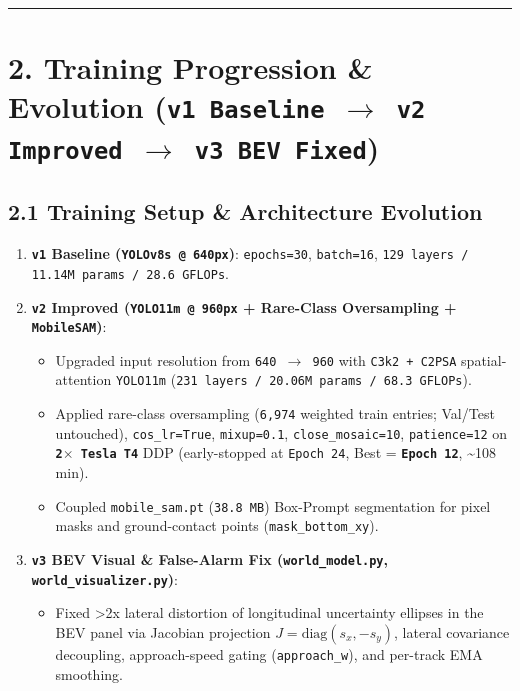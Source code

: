\documentclass[10.5pt,a4paper]{article}
\begin{document}
\par\noindent\rule{\textwidth}{0.4pt}\par\medskip

\section{2. Training Progression \& Evolution (\texttt{v1 Baseline $\rightarrow$ v2 Improved $\rightarrow$ v3 BEV Fixed})}

\subsection{2.1 Training Setup \& Architecture Evolution}
\begin{enumerate}[leftmargin=1.8em,itemsep=2pt]
\item \textbf{\texttt{v1} Baseline (\texttt{YOLOv8s @ 640px})}: \texttt{epochs=30}, \texttt{batch=16}, \texttt{129 layers /\allowbreak{} 11.\allowbreak{}14M params /\allowbreak{} 28.\allowbreak{}6 GFLOPs}.
\item \textbf{\texttt{v2} Improved (\texttt{YOLO11m @ 960px} + Rare-Class Oversampling + \texttt{MobileSAM})}:
\begin{itemize}[leftmargin=1.5em,itemsep=2pt]
\item Upgraded input resolution from \texttt{640 $\rightarrow$ 960} with \texttt{C3k2 + C2PSA} spatial-attention \texttt{YOLO11m} (\texttt{231 layers /\allowbreak{} 20.\allowbreak{}06M params /\allowbreak{} 68.\allowbreak{}3 GFLOPs}).
\item Applied rare-class oversampling (\texttt{6,\allowbreak{}974} weighted train entries; Val/Test untouched), \texttt{cos\_\allowbreak{}lr=True}, \texttt{mixup=0.\allowbreak{}1}, \texttt{close\_\allowbreak{}mosaic=10}, \texttt{patience=12} on \textbf{\texttt{2$\times$ Tesla T4}} DDP (early-stopped at \texttt{Epoch 24}, Best = \textbf{\texttt{Epoch 12}}, \textasciitilde{}108 min).
\item Coupled \texttt{mobile\_\allowbreak{}sam.\allowbreak{}pt} (\texttt{38.\allowbreak{}8 MB}) Box-Prompt segmentation for pixel masks and ground-contact points (\texttt{mask\_\allowbreak{}bottom\_\allowbreak{}xy}).
\end{itemize}
\item \textbf{\texttt{v3} BEV Visual \& False-Alarm Fix (\texttt{world\_\allowbreak{}model.\allowbreak{}py}, \texttt{world\_\allowbreak{}visualizer.\allowbreak{}py})}:
\begin{itemize}[leftmargin=1.5em,itemsep=2pt]
\item Fixed >2x lateral distortion of longitudinal uncertainty ellipses in the BEV panel via Jacobian projection $J=\text{diag}(s_x,-s_y)$, lateral covariance decoupling, approach-speed gating (\texttt{approach\_\allowbreak{}w}), and per-track EMA smoothing.
\end{itemize}
\end{enumerate}
\end{document}
